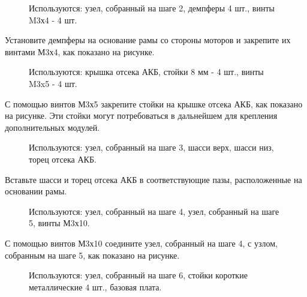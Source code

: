 \documentclass[a4paper,10pt,russian]{sphinxmanual}
\begin{document}
\begin{figure}[H]
\centering
\capstart

\noindent{}
\caption{Используются: узел, собранный на шаге 2, демпферы \textendash{} 4 шт., винты M3х4 - 4 шт.}\label{\detokenize{const/const_frame:id4}}\end{figure}

Установите демпферы на основание рамы со стороны моторов и закрепите их винтами М3х4, как показано на рисунке.


\begin{figure}[H]
\centering
\capstart

\noindent{}
\caption{Используются: крышка отсека АКБ, стойки 8 мм - 4 шт., винты M3x5 - 4 шт.}\label{\detokenize{const/const_frame:id5}}\end{figure}

С помощью винтов М3х5 закрепите стойки на крышке отсека АКБ, как показано на рисунке. Эти стойки могут потребоваться в дальнейшем для крепления дополнительных модулей.


\begin{figure}[H]
\centering
\capstart

\noindent{}
\caption{Используются: узел, собранный на шаге 3, шасси верх, шасси низ, торец отсека АКБ.}\label{\detokenize{const/const_frame:id6}}\end{figure}

Вставьте шасси и торец отсека АКБ в соответствующие пазы, расположенные на основании рамы.


\begin{figure}[H]
\centering
\capstart

\noindent{}
\caption{Используются: узел, собранный на шаге 4, узел, собранный на шаге 5, винты М3х10.}\label{\detokenize{const/const_frame:id7}}\end{figure}

С помощью винтов М3х10 соедините узел, собранный на шаге 4, с узлом, собранным на шаге 5, как показано на рисунке.


\begin{figure}[H]
\centering
\capstart

\noindent{}
\caption{Используются: узел, собранный на шаге 6, стойки короткие металлические 4 шт., базовая плата.}\label{\detokenize{const/const_frame:id8}}\end{figure}
\end{document}
